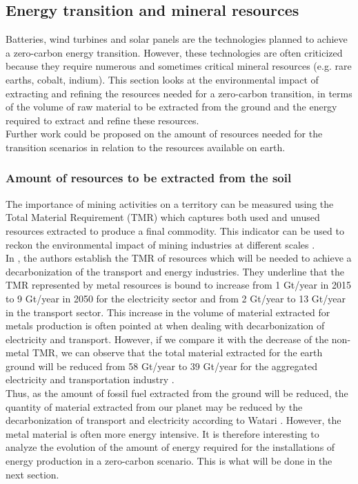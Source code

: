 \documentclass[conference]{IEEEtran}
\begin{document}
\subsection{Energy transition and mineral resources}
Batteries, wind turbines and solar panels are the technologies planned to achieve a zero-carbon energy transition. However, these technologies are often criticized because they require numerous and sometimes critical mineral resources (e.g. rare earths, cobalt, indium). This section looks at the environmental impact of extracting and refining the resources needed for a zero-carbon transition, in terms of the volume of raw material to be extracted from the ground and the energy required to extract and refine these resources. 
\\
Further work could be proposed on the amount of resources needed for the transition scenarios in relation to the resources available on earth. 

\subsubsection{Amount of resources to be extracted from the soil}
The importance of mining activities on a territory can be measured using the Total Material Requirement (TMR) which captures both used and unused resources extracted to produce a final commodity. This indicator can be used to reckon the environmental impact of mining industries at different scales \cite{watari_sustainable_2021}. 
\\
In \cite{bleischwitz_extrapolation_2018}, the authors establish the TMR of resources which will be needed to achieve a decarbonization of the transport and energy industries. They underline that the TMR represented by metal resources is bound to increase from 1 Gt/year in 2015 to 9 Gt/year in 2050 for the electricity sector and from 2 Gt/year to 13 Gt/year in the transport sector. This increase in the volume of material extracted for metals production is often pointed at when dealing with decarbonization of electricity and transport. However, if we compare it with the decrease of the non-metal TMR, we can observe that the total material extracted for the earth ground will be reduced from 58 Gt/year to 39 Gt/year for the aggregated electricity and transportation industry \cite{watari_sustainable_2021}. 
\\
Thus, as the amount of fossil fuel extracted from the ground will be reduced, the quantity of material extracted from our planet may be reduced by the decarbonization of transport and electricity according to Watari \cite{watari_sustainable_2021}. However, the metal material is often more energy intensive. It is therefore interesting to analyze the evolution of the amount of energy required for the installations of energy production in a zero-carbon scenario. This is what will be done in the next section. 
\end{document}

